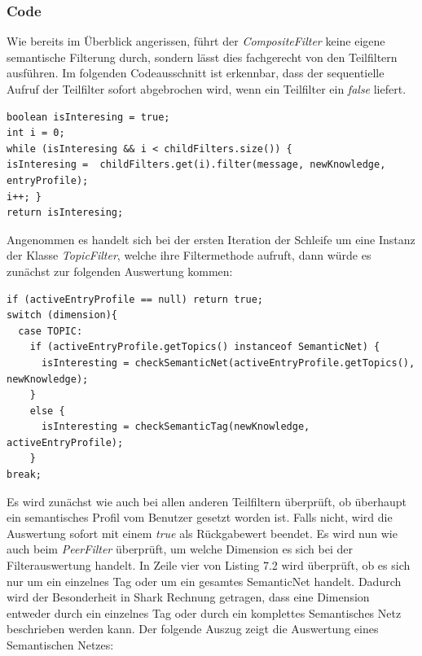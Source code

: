 \subsubsection{Code}
Wie bereits im Überblick angerissen, führt der \textit{CompositeFilter} keine eigene semantische Filterung durch, sondern lässt dies fachgerecht von den Teilfiltern ausführen. Im folgenden Codeausschnitt ist erkennbar, dass der sequentielle Aufruf der Teilfilter sofort abgebrochen wird, wenn ein Teilfilter ein \textit{false} liefert.\newline
\lstset{language=Java, caption=Filtermethode im Kompositum, label=DescriptiveLabel, numbers=left, numbersep=1em, breaklines=true, basicstyle=\small}
\begin{lstlisting}
boolean isInteresing = true;
int i = 0;
while (isInteresing && i < childFilters.size()) {
isInteresing =  childFilters.get(i).filter(message, newKnowledge, entryProfile);
i++; }
return isInteresing;
\end{lstlisting}
Angenommen es handelt sich bei der ersten Iteration der Schleife um eine Instanz der Klasse \textit{TopicFilter}, welche ihre Filtermethode aufruft, dann würde es zunächst zur folgenden Auswertung kommen:\newline
\lstset{language=Java, caption=Filtermethode des TopicType Filters (Auszug), label=DescriptiveLabel, numbers=left, numbersep=1em, breaklines=true, basicstyle=\small}
\begin{lstlisting}
if (activeEntryProfile == null) return true;
switch (dimension){
  case TOPIC:
    if (activeEntryProfile.getTopics() instanceof SemanticNet) {
	  isInteresting = checkSemanticNet(activeEntryProfile.getTopics(), newKnowledge);
	}
	else {
	  isInteresting = checkSemanticTag(newKnowledge, activeEntryProfile);
    }
break;
\end{lstlisting}
Es wird zunächst wie auch bei allen anderen Teilfiltern überprüft, ob überhaupt ein semantisches Profil vom Benutzer gesetzt worden ist. Falls nicht, wird die Auswertung sofort mit einem \textit{true} als Rückgabewert beendet. Es wird nun wie auch beim \textit{PeerFilter} überprüft, um welche Dimension es sich bei der Filterauswertung handelt. In Zeile vier von Listing 7.2 wird überprüft, ob es sich nur um ein einzelnes Tag oder um ein gesamtes SemanticNet handelt. Dadurch wird der Besonderheit in Shark Rechnung getragen, dass eine Dimension entweder durch ein einzelnes Tag oder durch ein komplettes Semantisches Netz beschrieben werden kann. Der folgende Auszug zeigt die Auswertung eines Semantischen Netzes:\newline
